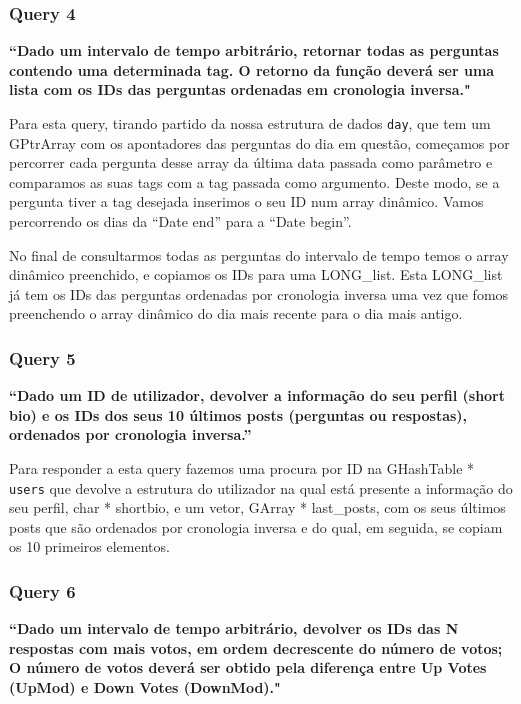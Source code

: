 \documentclass[a4paper]{article}
\begin{document}
\subsubsection*{Query 4}
\label{sec:query4}

\textbf{“Dado um intervalo de tempo arbitrário, retornar todas as perguntas contendo uma determinada tag.
O retorno da função deverá ser uma lista com os IDs das perguntas ordenadas em cronologia inversa."}

Para esta query, tirando partido da nossa estrutura de dados \texttt{day},
que tem um GPtrArray com
os apontadores das perguntas do dia em questão, começamos por percorrer cada pergunta desse array
da última data passada como parâmetro e comparamos as suas tags com a tag passada como argumento.
Deste modo, se a pergunta tiver a tag desejada inserimos o seu ID num array dinâmico.
Vamos percorrendo os dias da “Date end” para a “Date begin”.

No final de consultarmos todas as perguntas do intervalo de tempo temos o array dinâmico preenchido,
e copiamos os IDs para uma LONG\_list.
Esta LONG\_list já tem os IDs das perguntas ordenadas por cronologia inversa uma vez que
fomos preenchendo o array dinâmico do dia mais recente para o dia mais antigo.



\subsubsection*{Query 5}
\label{sec:query5}

\textbf{“Dado um ID de utilizador,  devolver a informação do
seu perfil (short bio) e os IDs dos seus 10 últimos posts (perguntas ou respostas),
ordenados por cronologia inversa.”}

Para responder a esta query fazemos uma procura por ID na GHashTable * \texttt{users} que devolve
a estrutura do utilizador na qual está presente a informação do
seu perfil, char * shortbio, e um vetor, GArray * last\_posts, com os seus últimos posts que são
ordenados por cronologia inversa e do qual, em seguida, se copiam os 10 primeiros
elementos.

\subsubsection*{Query 6}
\label{sec:query6}

\textbf{“Dado um intervalo de tempo arbitrário, devolver os IDs das N respostas
com mais votos, em ordem decrescente do número de votos; O número de votos deverá
ser obtido pela diferença entre Up Votes (UpMod) e Down Votes (DownMod)."}
\end{document}
